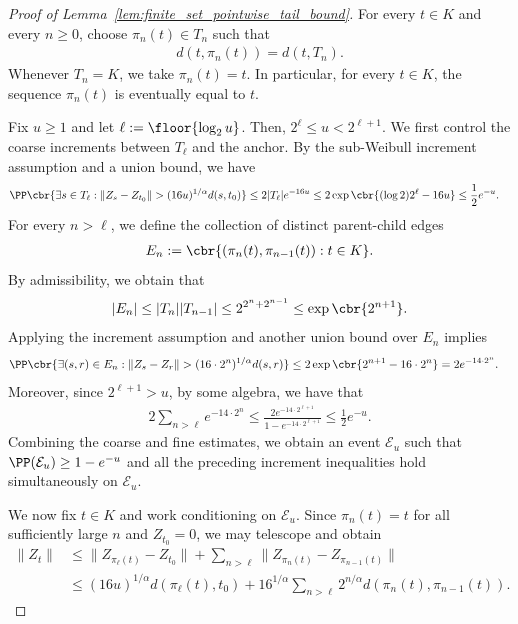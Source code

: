 \documentclass[11pt]{article}
\begin{document}
\begin{proof}[Proof of Lemma~\ref{lem:finite_set_pointwise_tail_bound}]
For every $t\in K$ and every $n\ge0$, choose
$\pi_n(t)\in T_n$ such that
\begin{align*}
d(t,\pi_n(t))=d(t,T_n).
\end{align*}
Whenever $T_n=K$, we take $\pi_n(t)=t$. In particular, for every
$t\in K$, the sequence $\pi_n(t)$ is eventually equal to $t$.

Fix $u\ge1$ and let $\ell:=\floor{\log_2u}$. Then, $2^\ell\le u<2^{\ell+1}$. We first control the coarse
increments between $T_\ell$ and the anchor. By the sub-Weibull
increment assumption and a union bound, we have
\begin{align*}
&\PP\cbr{
\exists s\in T_\ell:
\|Z_s-Z_{t_0}\|>(16u)^{1/\alpha}d(s,t_0)
}\le
2|T_\ell|e^{-16u}\le
2\exp\cbr{(\log2)2^\ell-16u}\le
\frac12e^{-u}.
\end{align*}
For every $n>\ell$, we define the collection of distinct parent-child
edges
\begin{align*}
E_n
:=
\cbr{
(\pi_n(t),\pi_{n-1}(t)):t\in K
}.
\end{align*}
By admissibility, we obtain that
\begin{align*}
|E_n|\le
|T_n||T_{n-1}|\le
2^{2^n+2^{n-1}}\le
\exp\cbr{2^{n+1}}.
\end{align*}
Applying the increment assumption and another union bound over $E_n$ implies
\begin{align*}
&\PP\cbr{
\exists(s,r)\in E_n:
\|Z_s-Z_r\|>(16\cdot2^n)^{1/\alpha}d(s,r)
}\le
2\exp\cbr{2^{n+1}-16\cdot2^n}=
2e^{-14\cdot2^n}.
\end{align*}
Moreover, since $2^{\ell+1}>u$, by some algebra, we have that
\begin{align*}
2\sum_{n>\ell}e^{-14\cdot2^n}\le
\frac{2e^{-14\cdot2^{\ell+1}}}
{1-e^{-14\cdot2^{\ell+1}}}\le
\frac12e^{-u}.
\end{align*}
Combining the coarse and fine estimates, we obtain an event
$\mathcal E_u$ such that $\PP(\mathcal E_u)\ge1-e^{-u}$ and all the preceding increment inequalities hold simultaneously on
$\mathcal E_u$.

We now fix $t\in K$ and work conditioning on $\mathcal E_u$. Since
$\pi_n(t)=t$ for all sufficiently large $n$ and $Z_{t_0}=0$, we may
telescope and obtain
\begin{align*}
\|Z_t\|
&\le
\|Z_{\pi_\ell(t)}-Z_{t_0}\|
+
\sum_{n>\ell}
\|Z_{\pi_n(t)}-Z_{\pi_{n-1}(t)}\|\\
&\le
(16u)^{1/\alpha}d(\pi_\ell(t),t_0)
+
16^{1/\alpha}
\sum_{n>\ell}2^{n/\alpha}
d(\pi_n(t),\pi_{n-1}(t)).
\end{align*}


\end{proof}
\end{document}
